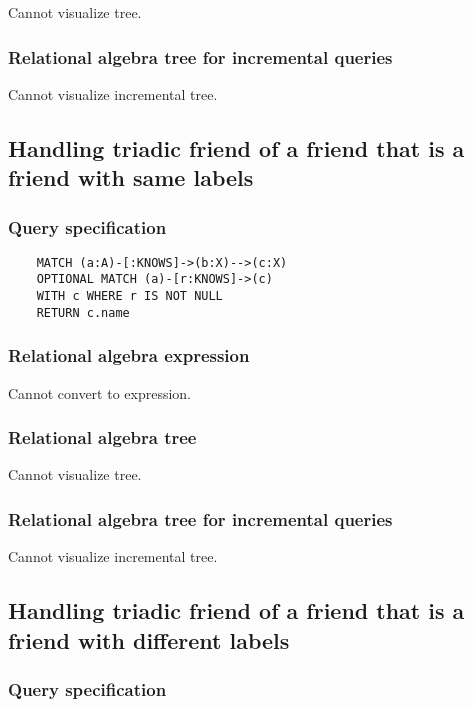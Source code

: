 	Cannot visualize tree.

	\subsubsection*{Relational algebra tree for incremental queries}

	Cannot visualize incremental tree.
	\subsection{Handling triadic friend of a friend that is a friend with same labels}

	\subsubsection*{Query specification}

	\begin{lstlisting}
	MATCH (a:A)-[:KNOWS]->(b:X)-->(c:X)
	OPTIONAL MATCH (a)-[r:KNOWS]->(c)
	WITH c WHERE r IS NOT NULL
	RETURN c.name
	\end{lstlisting}


	\subsubsection*{Relational algebra expression}

	Cannot convert to expression.

	\subsubsection*{Relational algebra tree}

	Cannot visualize tree.

	\subsubsection*{Relational algebra tree for incremental queries}

	Cannot visualize incremental tree.
	\subsection{Handling triadic friend of a friend that is a friend with different labels}

	\subsubsection*{Query specification}


